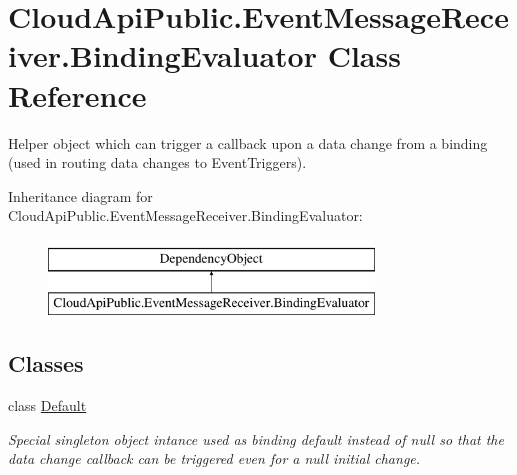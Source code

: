 \hypertarget{class_cloud_api_public_1_1_event_message_receiver_1_1_binding_evaluator}{\section{Cloud\-Api\-Public.\-Event\-Message\-Receiver.\-Binding\-Evaluator Class Reference}
\label{class_cloud_api_public_1_1_event_message_receiver_1_1_binding_evaluator}
}


Helper object which can trigger a callback upon a data change from a binding (used in routing data changes to Event\-Triggers).  


Inheritance diagram for Cloud\-Api\-Public.\-Event\-Message\-Receiver.\-Binding\-Evaluator\-:\begin{figure}[H]
\begin{center}
\leavevmode
\includegraphics[height=2.000000cm]{class_cloud_api_public_1_1_event_message_receiver_1_1_binding_evaluator}
\end{center}
\end{figure}
\subsection*{Classes}
\begin{DoxyCompactItemize}
\item 
class \hyperlink{class_cloud_api_public_1_1_event_message_receiver_1_1_binding_evaluator_1_1_default}{Default}
\begin{DoxyCompactList}\small\item\em Special singleton object intance used as binding default instead of null so that the data change callback can be triggered even for a null initial change. \end{DoxyCompactList}\end{DoxyCompactItemize}

